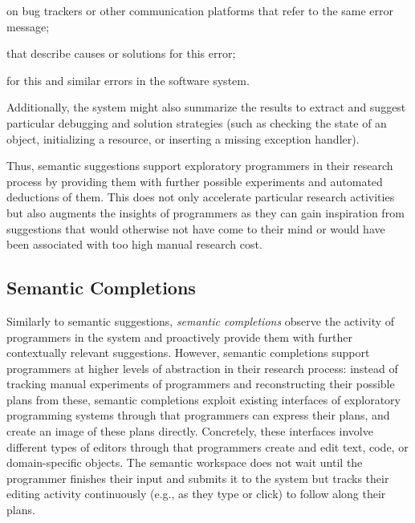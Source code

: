 	\begin{description}[noextralabelsep]
		\item[bug reports] on bug trackers or other communication platforms that refer to the same error message;
		\item[documentation artifacts] that describe causes or solutions for this error;
		\item[exception handlers] for this and similar errors in the software system.
	\end{description}

	Additionally, the system might also summarize the results to extract and suggest particular debugging and solution strategies (such as checking the state of an object, initializing a resource, or inserting a missing exception handler).


\ParSep

Thus, semantic suggestions support exploratory programmers in their research process by providing them with further possible experiments and automated deductions of them.
This does not only accelerate particular research activities but also augments the insights of programmers as they can gain inspiration from suggestions that would otherwise not have come to their mind or would have been associated with too high manual research cost.

\subsection{Semantic Completions}
\label{sec:approach/workspace/completions}

Similarly to semantic suggestions, \emph{semantic completions} observe the activity of programmers in the system and proactively provide them with further contextually relevant suggestions.
However, semantic completions support programmers at higher levels of abstraction in their research process:
instead of tracking manual experiments of programmers and reconstructing their possible plans from these, semantic completions exploit existing interfaces of exploratory programming systems through that programmers can express their plans, and create an image of these plans directly.
Concretely, these interfaces involve different types of editors through that programmers create and edit text, code, or domain-specific objects.
The semantic workspace does not wait until the programmer finishes their input and submits it to the system but tracks their editing activity continuously (e.g., as they type or click) to follow along their plans.

